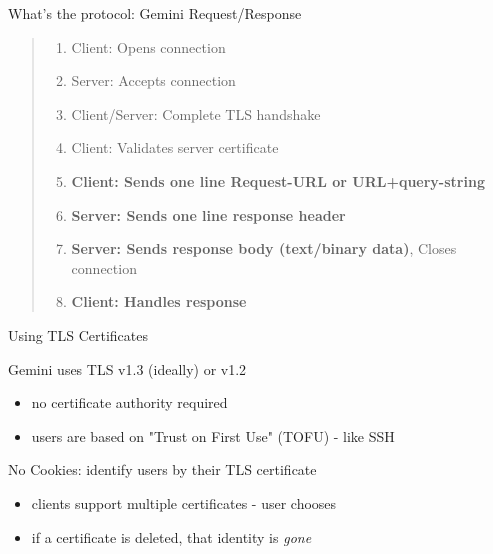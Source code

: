 \documentclass[presentation, 11pt,  aspectratio=169]{beamer}
\renewcommand{\alert}[1]{\textbf{\textcolor{mydarkred}{#1}}}
\begin{document}
\begin{frame}[label={sec:orgae5e22b}]{What's the protocol: Gemini Request/Response}
\begin{quote}
\begin{enumerate}
\item Client: Opens connection\\
\item Server: Accepts connection\\
\item Client/Server: Complete TLS handshake\\
\item Client: Validates server certificate\\
\item \alert{Client: Sends one line Request-URL or URL+query-string}\\
\item \alert{Server: Sends one line response header}\\
\item \alert{Server: Sends response body (text/binary data)}, Closes connection\\
\item \alert{Client: Handles response}\\
\end{enumerate}
\end{quote}
\end{frame}

\begin{frame}[label={sec:orgd7e7b0b}]{Using TLS Certificates}
\begin{block}{Gemini uses TLS v1.3 (ideally) or v1.2}
\begin{itemize}
\item no certificate authority required\\
\item users are based on "Trust on First Use" (TOFU) - like SSH\\
\end{itemize}

\pause
\end{block}
\begin{block}{No Cookies: identify users by their TLS certificate}
\begin{itemize}
\item clients support multiple certificates - user chooses\\
\item if a certificate is deleted, that identity is \emph{gone}\\
\end{itemize}
\end{block}
\end{frame}
\end{document}
